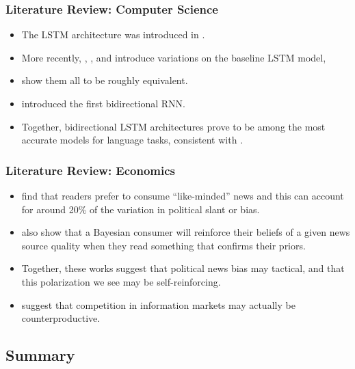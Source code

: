 \documentclass{beamer}
\begin{document}
	\begin{frame}
		\frametitle{Literature Review: Computer Science}
		\begin{itemize}
			\item The LSTM architecture was introduced in \citet{hochreiter1997long}. 
			\item More recently, \citet{gers2000recurrent}, \citet{chung2014empirical}, and \citet{yao2015depth} introduce variations on the baseline \citet{hochreiter1997long} LSTM model, 
			\item \citet{greff2016lstm} show them all to be roughly equivalent. 
			\item \citet{schuster1997bidirectional} introduced the first bidirectional RNN. 
			\item Together, bidirectional LSTM architectures prove to be among the most accurate models for language tasks, consistent with \citet{wang2015unified}. 
		\end{itemize}
	\end{frame}
	
	\begin{frame}
		\frametitle{Literature Review: Economics}
		\begin{itemize}
			\item \citet{gentzkow2010drives} find that readers prefer to consume ``like-minded'' news and this can account for around 20\% of the variation in political slant or bias.
			\item \citet{gentzkow2006media} also show that a Bayesian consumer will reinforce their beliefs of a given news source quality when they read something that confirms their priors.
			\item Together, these works suggest that political news bias may tactical, and that this polarization we see may be self-reinforcing.
			\item \citet{gentzkow2008competition} suggest that competition in information markets may actually be counterproductive. 
		\end{itemize}
	\end{frame}

    \subsection{Summary}
    
\end{document}
